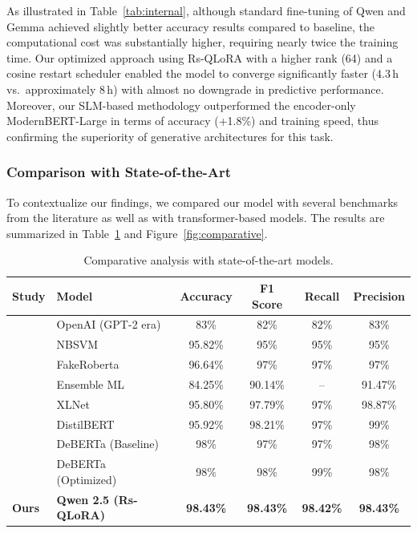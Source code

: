\documentclass[utf8]{FrontiersinHarvard}
\begin{document}
As illustrated in Table~\ref{tab:internal}, although standard fine-tuning of Qwen and Gemma achieved slightly better accuracy results compared to baseline, the computational cost was substantially higher, requiring nearly twice the training time. Our optimized approach using Rs-QLoRA with a higher rank (64) and a cosine restart scheduler enabled the model to converge significantly faster (4.3\,h vs.\ approximately 8\,h) with almost no downgrade in predictive performance. Moreover, our SLM-based methodology outperformed the encoder-only ModernBERT-Large in terms of accuracy (+1.8\%) and training speed, thus confirming the superiority of generative architectures for this task.

\subsubsection{Comparison with State-of-the-Art}

To contextualize our findings, we compared our model with several benchmarks from the literature as well as with transformer-based models. The results are summarized in Table~\ref{tab:sota} and Figure~\ref{fig:comparative}.

\begin{table}[htbp]
\caption{Comparative analysis with state-of-the-art models.}\label{tab:sota}
\centering
\begin{tabular}{llcccc}
\toprule
\textbf{Study} & \textbf{Model} & \textbf{Accuracy} & \textbf{F1 Score} & \textbf{Recall} & \textbf{Precision} \\
\midrule
\citet{Salminen2022} & OpenAI (GPT-2 era)  & 83\%    & 82\%    & 82\%    & 83\% \\
                      & NBSVM               & 95.82\% & 95\%    & 95\%    & 95\% \\
                      & FakeRoberta         & 96.64\% & 97\%    & 97\%    & 97\% \\
\citet{Shajalal2024}  & Ensemble ML         & 84.25\% & 90.14\% & --      & 91.47\% \\
                      & XLNet               & 95.80\% & 97.79\% & 97\%    & 98.87\% \\
                      & DistilBERT          & 95.92\% & 98.21\% & 97\%    & 99\% \\
\citet{Geetha2025}    & DeBERTa (Baseline)  & 98\%    & 97\%    & 97\%    & 98\% \\
                      & DeBERTa (Optimized) & 98\%    & 98\%    & 99\%    & 98\% \\
\textbf{Ours}         & \textbf{Qwen 2.5 (Rs-QLoRA)} & \textbf{98.43\%} & \textbf{98.43\%} & \textbf{98.42\%} & \textbf{98.43\%} \\
\bottomrule
\end{tabular}
\end{table}
\end{document}
